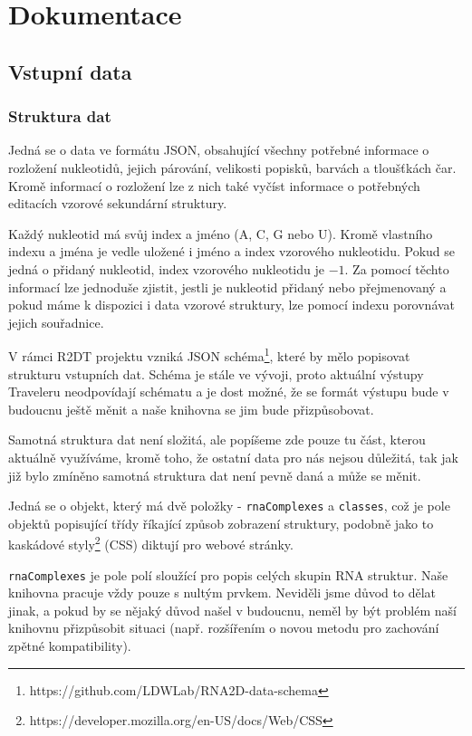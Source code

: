 \chapter{Dokumentace}

\section{Vstupní data}

\subsection{Struktura dat}

Jedná se o data ve formátu JSON, obsahující všechny potřebné informace o
rozložení nukleotidů, jejich párování, velikosti popisků, barvách a tloušťkách
čar. Kromě informací o rozložení lze z nich také vyčíst informace o potřebných
editacích vzorové sekundární struktury.

Každý nukleotid má svůj index a jméno (A, C, G nebo U). Kromě vlastního indexu
a jména je vedle uložené i jméno a index vzorového nukleotidu. Pokud se jedná o
přidaný nukleotid, index vzorového nukleotidu je $-1$. Za pomocí těchto
informací lze jednoduše zjistit, jestli je nukleotid přidaný nebo přejmenovaný
a pokud máme k dispozici i data vzorové struktury, lze pomocí indexu porovnávat
jejich souřadnice.

V rámci R2DT projektu vzniká JSON
schéma\footnote{https://github.com/LDWLab/RNA2D-data-schema}, které by mělo
popisovat strukturu vstupních dat. Schéma je stále ve vývoji, proto aktuální
výstupy Traveleru neodpovídají schématu a je dost možné, že se formát výstupu
bude v budoucnu ještě měnit a naše knihovna se jim bude přizpůsobovat.

Samotná struktura dat není složitá, ale popíšeme zde pouze tu část, kterou
aktuálně využíváme, kromě toho, že ostatní data pro nás nejsou důležitá, tak
jak již bylo zmíněno samotná struktura dat není pevně daná a může se měnit.

Jedná se o objekt, který má dvě položky - \texttt{rnaComplexes} a
\texttt{classes}, což je pole objektů popisující třídy říkající způsob
zobrazení struktury, podobně jako to kaskádové
styly\footnote{https://developer.mozilla.org/en-US/docs/Web/CSS} (CSS) diktují
pro webové stránky. 

\texttt{rnaComplexes} je pole polí sloužící pro popis celých skupin RNA
struktur. Naše knihovna pracuje vždy pouze s nultým prvkem. Neviděli jsme důvod
to dělat jinak, a pokud by se nějaký důvod našel v budoucnu, neměl by být
problém naší knihovnu přizpůsobit situaci (např. rozšířením o novou metodu pro
zachování zpětné kompatibility).

